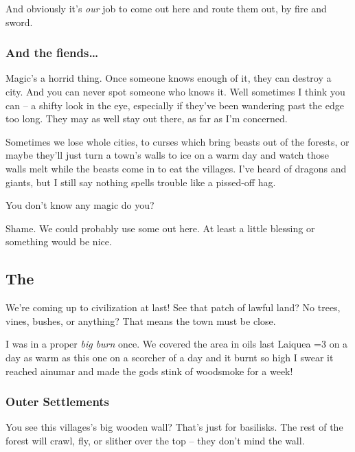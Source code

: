 \begin{multicols}{2}
\begin{exampletext}
  And obviously it's \emph{our} job to come out here and route them out, by fire and sword.


  \subsubsection*{And the fiends\ldots}

  Magic's a horrid thing.
  Once someone knows enough of it, they can destroy a city.
  And you can never spot someone who knows it.
  Well sometimes I think you can -- a shifty look in the eye, especially if they've been wandering past the \gls{edge} too long.
  They may as well stay out there, as far as I'm concerned.

  Sometimes we lose whole cities, to curses which bring beasts out of the forests, or maybe they'll just turn a town's walls to ice on a warm day and watch those walls melt while the beasts come in to eat the \glspl{village}.
  I've heard of dragons and giants, but I still say nothing spells trouble like a pissed-off hag.

  You don't know any magic do you?

  Shame.
  We could probably use some out here.
  At least a little blessing or something would be nice.
\end{exampletext}

\subsection*{The }

\begin{exampletext}
  We're coming up to civilization at last!
  See that patch of lawful land?
  No trees, vines, bushes, or anything?
  That means the town must be close.

  I was in a proper \textit{big burn} once.
  We covered the area in oils last Laiquea \ifnum\value{temperature}=3 on a day as warm as this one \else on a scorcher of a day \fi and it burnt so high I swear it reached \gls{ainumar} and made the gods stink of woodsmoke for a week!

  \subsubsection*{Outer Settlements}

  You see this \glspl{village}'s big wooden wall?
  That's just for basilisks.
  The rest of the forest will crawl, fly, or slither over the top -- they don't mind the wall.


\end{exampletext}
\end{multicols}
